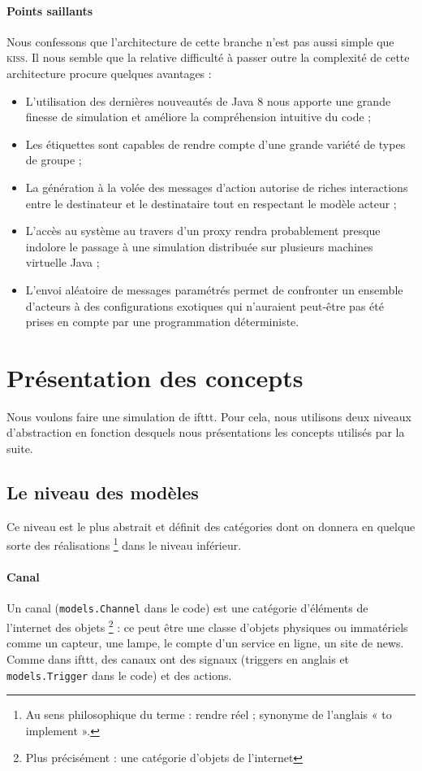 \documentclass[11pt]{article}
\begin{document}
\paragraph{Points saillants} Nous confessons que l'architecture de cette branche n'est pas aussi simple que \textsc{kiss}. Il nous semble que la relative difficulté à passer outre la complexité de cette architecture procure quelques avantages :
\begin{itemize}
\item L'utilisation des dernières nouveautés de Java 8 nous apporte une grande finesse de simulation et améliore la compréhension intuitive du code ;
\item Les étiquettes sont capables de rendre compte d'une grande variété de types de groupe ;
\item La génération à la volée des messages d'action autorise de riches interactions entre le destinateur et le destinataire tout en respectant le modèle acteur ;
\item L'accès au système au travers d'un proxy rendra probablement presque indolore le passage à une simulation distribuée sur plusieurs machines virtuelle Java ;
\item L'envoi aléatoire de messages paramétrés permet de confronter un ensemble d'acteurs à des configurations exotiques qui n'auraient peut-être pas été prises en compte par une programmation déterministe.
\end{itemize}

\section{Présentation des concepts}

Nous voulons faire une simulation de ifttt. Pour cela, nous utilisons deux niveaux d'abstraction en fonction desquels nous présentations les concepts utilisés par la suite.

\subsection{Le niveau des modèles} Ce niveau est le plus abstrait et définit des catégories dont on donnera en quelque sorte des réalisations \footnote{Au sens philosophique du terme : rendre réel ; synonyme de l'anglais « to implement ».} dans le niveau inférieur.

\paragraph{Canal} Un canal (\texttt{models.Channel} dans le code) est une catégorie d'éléments de l'internet des objets \footnote{Plus précisément : une catégorie d'objets de l'internet} : ce peut être une classe d'objets physiques ou immatériels comme un capteur, une lampe, le compte d'un service en ligne, un site de news. Comme dans ifttt, des canaux ont des signaux (triggers en anglais et \texttt{models.Trigger} dans le code) et des actions.
\end{document}
